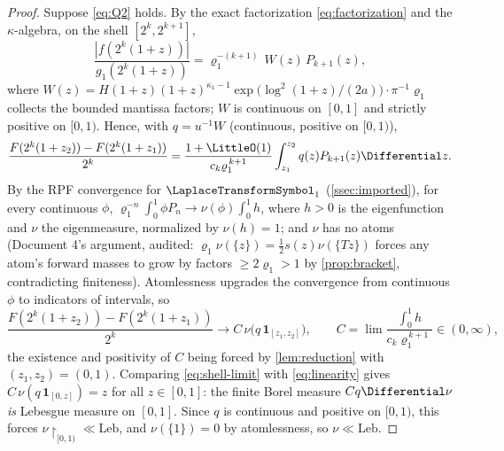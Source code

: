 \documentclass[11pt,oneside]{article}
\theoremstyle{definition}
\theoremstyle{remark}
\begin{document}
\begin{proof}
Suppose \eqref{eq:Q2} holds.  By the exact factorization
\eqref{eq:factorization} and the $\kappa$-algebra, on the shell
$[2^k,2^{k+1}]$,
\[
 \frac{|f(2^k(1+z))|}{g_1(2^k(1+z))}
 =\varrho_1^{-(k+1)}\,W(z)\,P_{k+1}(z),
\]
where $W(z)=H(1+z)(1+z)^{\kappa_1-1}
\exp\bigl(\log^2(1+z)/(2a)\bigr)\cdot\pi^{-1}\varrho_1$ collects the
bounded mantissa factors; $W$ is continuous on $[0,1]$ and strictly
positive on $[0,1)$.  Hence, with $q=u^{-1}W$ (continuous, positive on
$[0,1)$),
\[
 \frac{F(2^k(1+z_2))-F(2^k(1+z_1))}{2^k}
 =\frac{1+\LittleO(1)}{c_k\varrho_1^{\,k+1}}
 \int_{z_1}^{z_2}q(z)P_{k+1}(z)\Differential z .
\]
By the RPF convergence for $\LaplaceTransformSymbol_1$ (\cref{ssec:imported}), for every
continuous $\phi$,
$\varrho_1^{-n}\int_0^1\phi P_n\to\nu(\phi)\int_0^1h$, where
$h>0$ is the eigenfunction and $\nu$ the eigenmeasure, normalized by
$\nu(h)=1$; and $\nu$ has no atoms (Document 4's argument, audited:
$\varrho_1\nu(\{z\})=\tfrac12s(z)\nu(\{Tz\})$ forces any atom's forward
masses to grow by factors $\ge2\varrho_1>1$ by
\cref{prop:bracket}, contradicting finiteness).  Atomlessness upgrades
the convergence from continuous $\phi$ to indicators of intervals, so
\begin{equation}
 \frac{F(2^k(1+z_2))-F(2^k(1+z_1))}{2^k}
 \longrightarrow
 C\,\nu\bigl(q\,\mathbf 1_{[z_1,z_2]}\bigr),
 \qquad
 C=\lim\frac{\int_0^1h}{c_k\varrho_1^{\,k+1}}\in(0,\infty),
 \label{eq:shell-limit}
\end{equation}
the existence and positivity of $C$ being forced by
\cref{lem:reduction} with $(z_1,z_2)=(0,1)$.  Comparing
\eqref{eq:shell-limit} with \eqref{eq:linearity} gives
$C\,\nu(q\,\mathbf 1_{[0,z]})=z$ for all $z\in[0,1]$: the finite Borel
measure $Cq\Differential\nu$ \emph{is} Lebesgue measure on $[0,1]$.  Since $q$ is
continuous and positive on $[0,1)$, this forces
$\nu\restriction_{[0,1)}\ll\mathrm{Leb}$, and $\nu(\{1\})=0$ by
atomlessness, so $\nu\ll\mathrm{Leb}$.


\end{proof}
\end{document}
